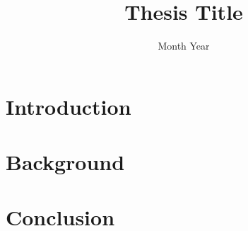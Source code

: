 \documentclass[
    12pt,
    a4paper,
]{report}
\title{Thesis Title}
\date{Month Year}
\begin{document}





\chapter{Introduction}


\chapter{Background}


\chapter{Conclusion}




\appendix

% 

\printbibliography[heading=bibintoc, title={References}]
\end{document}
